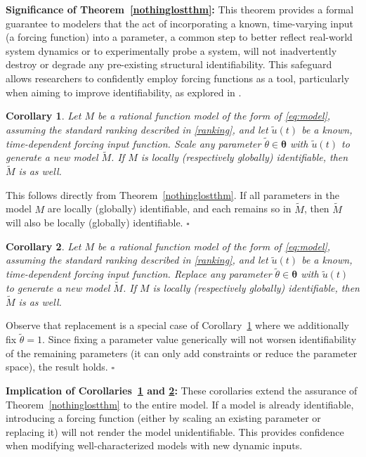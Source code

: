 \documentclass[a4paper,fleqn]{cas-dc}
\newtheorem{corollary}{Corollary}
\theoremstyle{definition}
\begin{document}
\noindent \textbf{Significance of Theorem~\ref{nothinglostthm}:} This theorem provides a formal guarantee to modelers that the act of incorporating a known, time-varying input (a forcing function) into a parameter, a common step to better reflect real-world system dynamics or to experimentally probe a system, will not inadvertently destroy or degrade any pre-existing structural identifiability. This safeguard allows researchers to confidently employ forcing functions as a tool, particularly when aiming to improve identifiability, as explored in .


\begin{corollary}\label{cor1}
   Let $M$ be a rational function model of the form of \cref{eq:model}, assuming the standard ranking described in \cref{ranking}, and let $\tilde{u}(t)$ be a known, time-dependent forcing input function.
   Scale any parameter $\tilde{\theta} \in \pmb{\theta}$ with $\tilde{u}(t)$ to generate a new model $\tilde{M}$. If $M$ is locally (respectively globally) identifiable, then $\tilde{M}$ is as well.
\end{corollary}
\begin{pf}
    This follows directly from Theorem~\ref{nothinglostthm}. 
    If all parameters in the model $M$ are locally (globally) identifiable, and each remains so in $\tilde{M}$, then $\tilde{M}$ will also be locally (globally) identifiable. $\square$
\end{pf}

\begin{corollary} \label{cor2}
   Let $M$ be a rational function model of the form of \cref{eq:model}, assuming the standard ranking described in \cref{ranking}, and let $\tilde{u}(t)$ be a known, time-dependent forcing input function.
   Replace any parameter $\tilde{\theta} \in \pmb{\theta}$ with $\tilde{u}(t)$ to generate a new model $\tilde{M}$. If $M$ is locally (respectively globally) identifiable, then $\tilde{M}$ is as well.
\end{corollary}
\begin{pf}
    Observe that replacement is a special case of Corollary~\ref{cor1} where we additionally fix $\tilde{\theta} = 1$. Since fixing a parameter value generically will not worsen identifiability of the remaining parameters (it can only add constraints or reduce the parameter space), the result holds. $\square$
\end{pf}


\noindent \textbf{Implication of Corollaries~\ref{cor1} and \ref{cor2}:} These corollaries extend the assurance of Theorem~\ref{nothinglostthm} to the entire model. If a model is already identifiable, introducing a forcing function (either by scaling an existing parameter or replacing it) will not render the model unidentifiable. This provides confidence when modifying well-characterized models with new dynamic inputs.
\end{document}
